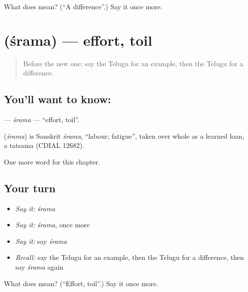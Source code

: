 \begin{tcolorbox}[breakable,colback=teal!4,colframe=teal!35!black,title={Before you move on}]
What does  mean? (\textquotedblleft{}A difference\textquotedblright{}.) Say it once more.
\end{tcolorbox}
\section[\texorpdfstring{\te{శ్రమ} (śrama)}{శ్రమ (śrama)}]{ (śrama) — effort, toil}

\label{lesson:TE-C218-srama}



\begin{quote}
Before the new one: say the Telugu for an example, then the Telugu for a difference.
\end{quote}

\subsection*{You'll want to know: }
\textbf{} — \emph{śrama} — \textquotedblleft{}effort, toil\textquotedblright{}.

\begin{cousinweb}
\textbf{} (\emph{śrama}) is Sanskrit \emph{śrama}, \textquotedblleft{}labour; fatigue\textquotedblright{}, taken over whole as a learned loan, a tatsama (CDIAL 12682).
\end{cousinweb}

\begin{grammarlens}[title={What you've built}]
One more word for this chapter.
\end{grammarlens}

\subsection*{Your turn}
\begin{itemize}
\raggedright
  \item \emph{Say it:} \emph{śrama}
  \item \emph{Say it:} \emph{śrama}, once more
  \item \emph{Say it:} say \emph{śrama}
  \item \emph{Recall:} say the Telugu for an example, then the Telugu for a difference, then say \emph{śrama} again
\end{itemize}

\begin{tcolorbox}[breakable,colback=teal!4,colframe=teal!35!black,title={Before you move on}]
What does  mean? (\textquotedblleft{}Effort, toil\textquotedblright{}.) Say it once more.
\end{tcolorbox}
